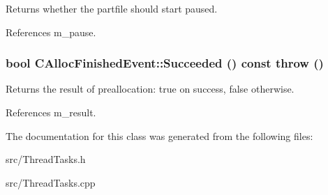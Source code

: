 Returns whether the partfile should start paused. 

References m\_\-pause.
\subsubsection[{Succeeded}]{\setlength{\rightskip}{0pt plus 5cm}bool CAllocFinishedEvent::Succeeded () const  throw ()\hspace{0.3cm}{\ttfamily  [inline]}}\label{classCAllocFinishedEvent_a1d2bdf8cfe0dc51c061bb9c9e11c6cb5}


Returns the result of preallocation: true on success, false otherwise. 

References m\_\-result.

The documentation for this class was generated from the following files:\begin{DoxyCompactItemize}
\item 
src/ThreadTasks.h\item 
src/ThreadTasks.cpp\end{DoxyCompactItemize}
